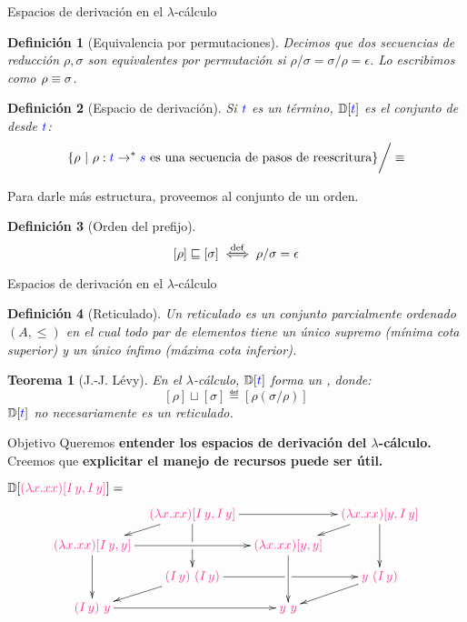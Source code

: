 \documentclass{beamer}
\newtheorem{defes}{Definición}
\newtheorem{teoes}{Teorema}
\newcommand{\cLam}[1]{{\color{darkBlue} #1}}
\newcommand{\cProto}[1]{{\color{lightBlue} #1}}
\begin{document}
\begin{frame}{Espacios de derivación en el $\lambda$-cálculo}

\begin{defes}[Equivalencia por permutaciones]
Decimos que dos secuencias de reducción $\rho, \sigma$ son equivalentes por permutación si $\rho/\sigma = \sigma/\rho = \epsilon$.
Lo escribimos como $\rho \equiv \sigma$.
\end{defes}

\begin{defes}[Espacio de derivación]
Si $\cLam{\tm}$ es un término, $\ulbDeriv{\cLam{\tm}}$ es el conjunto de
 desde $\cLam{\tm}$:
\[
  \set{\rho \ | \ \rho : \cLam{t} \to^* \cLam{s} \text{ es una secuencia de pasos de reescritura}} \bigg/ \permeq
\]
\end{defes}

Para darle más estructura, proveemos al conjunto de un orden.

\begin{defes}[Orden del prefijo]
\[[\rho] \sqsubseteq [\sigma]   \overset{\mathrm{def}}{\iff} \rho / \sigma = \epsilon\]
\end{defes}
\end{frame}

\begin{frame}{Espacios de derivación en el $\lambda$-cálculo}

\begin{defes}[Reticulado]
Un reticulado es un conjunto parcialmente ordenado $(A, \leq)$ en el cual
todo par de elementos tiene un único supremo (mínima cota superior)
y un único ínfimo (máxima cota inferior).
\end{defes}

\vskip 0.5cm

\begin{teoes}[J.-J. Lévy]
En el $\lambda$-cálculo, $\ulbDeriv{\cLam{t}}$ forma un ,
donde:
\[[\rho] \sqcup [\sigma] \eqdef [\rho (\sigma / \rho)] \]
\noindent $\ulbDeriv{\cLam{t}}$ no necesariamente es un reticulado.
\end{teoes}

\end{frame}


\begin{frame}{Objetivo}
Queremos \textbf{entender los espacios de derivación del $\lambda$-cálculo.}
\vskip 0.2cm
Creemos que \textbf{explicitar el manejo de recursos puede ser útil.}
\vskip 0.5cm

$\ulbDeriv{\cProto{(\lam{x}{x x}) [I\, y, I\, y]}} = $
\[\xymatrix@=0.3cm{
& \cProto{(\lam{x}{x x}) [I\, y, I\, y]} \ar[rr] \ar[dd]|!{[d]}\hole \ar[dl]
& & \cProto{(\lam{x}{x x}) [y, I\, y]} \ar[dd] \ar[dl]
\\
\cProto{(\lam{x}{x x}) [I\, y, y]} \ar[rr]\ar[dd]
& & \cProto{(\lam{x}{x x}) [y, y]} \ar[dd]
\\
& \cProto{(I\, y)\ (I\, y)} \ar[rr]|!{[r]}\hole \ar[dl]
& & \cProto{y\ (I\, y)} \ar[dl]
\\
\cProto{(I\, y)\ y} \ar[rr]
& & \cProto{y\ y}
}\]
\end{frame}
\end{document}
